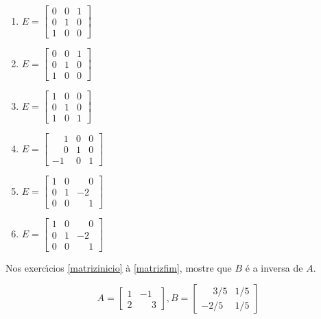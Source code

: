 \documentclass[12pt]{exam}
\begin{document}
\begin{exercicio}
\begin{multicols}{3}
\begin{enumerate}[label={\alph*})]
    \end{enumerate}
  \end{multicols}
  \begin{solucao}
    \begin{enumerate}[label={\alph*})]
      \item $E = \begin{bmatrix}0 & 0 & 1\\0 & 1 & 0\\1 & 0 & 0\end{bmatrix}$
      \item $E = \begin{bmatrix}0 & 0 & 1\\0 & 1 & 0\\1 & 0 & 0\end{bmatrix}$
      \item $E = \begin{bmatrix}1 & 0 & 0\\0 & 1 & 0\\1 & 0 & 1\end{bmatrix}$
      \item $E = \begin{bmatrix}\phantom{-} 1 & 0 & 0\\\phantom{-} 0 & 1 & 0\\-1 & 0 & 1\end{bmatrix}$
      \item $E = \begin{bmatrix}1 & 0 & \phantom{-} 0\\0 & 1 & -2\\0 & 0 & \phantom{-} 1\end{bmatrix}$
      \item $E = \begin{bmatrix}1 & 0 & \phantom{-} 0\\0 & 1 & -2\\0 & 0 & \phantom{-} 1\end{bmatrix}$
    \end{enumerate}
  \end{solucao}
\end{exercicio}

Nos exerc{\'\i}cios \ref{matrizinicio} \`a \ref{matrizfim}, mostre que $B$ \'e a inversa de $A$.
\begin{exercicio}\label{matrizinicio}
  \[
    A =\begin{bmatrix}
      1 & -1\\
      2 & \phantom{-} 3
    \end{bmatrix}, B =\begin{bmatrix}
      \phantom{-} 3/5 & 1/5\\
      -2/5 & 1/5
    \end{bmatrix}
  \]
\end{exercicio}
\end{document}
